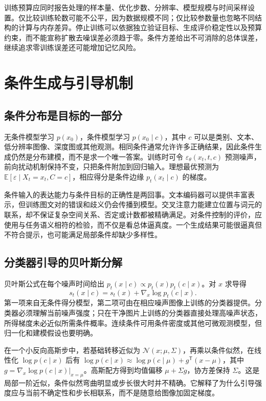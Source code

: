 \documentclass[UTF8,12pt,a4paper,fontset=fandol]{ctexart}
\begin{document}
训练预算应同时报告处理的样本量、优化步数、分辨率、模型规模与时间采样设置。仅比较训练轮数可能不公平，因为数据规模不同；仅比较参数量也忽略不同结构的计算与内存差异。停止训练可以依据独立验证目标、生成评价稳定性以及预算约束，而不能宣称扩散去噪误差必须趋于零。条件方差给出不可消除的总体误差，继续追求零训练误差还可能增加记忆风险。

\section{条件生成与引导机制}
\label{sec:diff-guidance}
\subsection{条件分布是目标的一部分}
无条件模型学习 $p(x_0)$，条件模型学习 $p(x_0\mid c)$，其中 $c$ 可以是类别、文本、低分辨率图像、深度图或其他观测。相同条件通常允许许多正确结果，因此条件生成仍然是分布建模，而不是求一个唯一答案。训练时可令 $\varepsilon_\theta(x_t,t,c)$ 预测噪声，前向扰动机制保持不变，只把条件附加到回归输入。理想最优预测为 $\mathbb E[\varepsilon\mid X_t=x_t,C=c]$，相应得分是条件边缘 $p_t(x_t\mid c)$ 的梯度。

条件输入的表达能力与条件目标的正确性是两回事。文本编码器可以提供丰富表示，但训练图文对的错误和歧义仍会传播到模型。交叉注意力能建立位置与词元的联系，却不保证复杂空间关系、否定或计数都被精确满足。对条件控制的评价，应使用与任务语义相符的检验，而不仅是看总体逼真度。一个生成结果可能很逼真但不符合提示，也可能满足局部条件却缺少多样性。

\subsection{分类器引导的贝叶斯分解}
贝叶斯公式在每个噪声时间给出 $p_t(x\mid c)\propto p_t(x)p_t(c\mid x)$。对 $x$ 求导得
\begin{equation}
 s_t(x\mid c)=s_t(x)+\nabla_x\log p_t(c\mid x).
 \label{eq:diff-classifier-guidance}
\end{equation}
第一项来自无条件得分模型，第二项可由在相应噪声图像上训练的分类器提供。分类器必须理解当前噪声强度；只在干净图片上训练的分类器直接处理高噪声状态，所得梯度未必近似所需条件概率。连续条件可用条件密度或其他可微观测模型，但归一化和建模假设也要明确。

在一个小反向高斯步中，若基础转移近似为 $\mathcal N(x;\mu,\Sigma)$，再乘以条件似然，在线性化 $\log p(c\mid x)$ 后有 $\log p(c\mid x)\approx\log p(c\mid\mu)+g^\mathsf T(x-\mu)$，其中 $g=\nabla_x\log p(c\mid x)|_{x=\mu}$。高斯配方得到均值偏移 $\mu+\Sigma g$，协方差保持 $\Sigma$。这是局部一阶近似，条件似然弯曲明显或步长很大时并不精确。它解释了为什么引导强度应与当前不确定性和步长相联系，而不是随意给图像加固定梯度。
\end{document}

